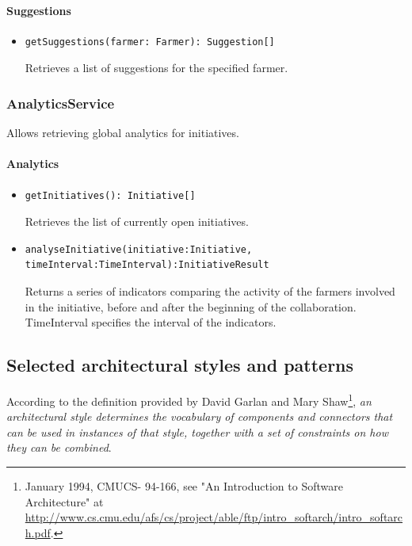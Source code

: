 \documentclass{article}
\begin{document}
\paragraph{Suggestions}
\begin{itemize}
\item \begin{verbatim}
getSuggestions(farmer: Farmer): Suggestion[]
\end{verbatim}
Retrieves a list of suggestions for the specified farmer.
\end{itemize}

\subsubsection{AnalyticsService}
Allows retrieving global analytics for initiatives.

\paragraph{Analytics}
\begin{itemize}
\item \begin{verbatim}
getInitiatives(): Initiative[]
\end{verbatim}
Retrieves the list of currently open initiatives.
\item \begin{verbatim}
analyseInitiative(initiative:Initiative, timeInterval:TimeInterval):InitiativeResult
\end{verbatim}
Returns a series of indicators comparing the activity of the farmers involved in the initiative, before and after the beginning of the collaboration. TimeInterval specifies the interval of the indicators.
\end{itemize}

\subsection{Selected architectural styles and patterns}
According to the definition provided by David Garlan and Mary Shaw\footnote{January 1994, CMUCS-
94-166, see "An Introduction to Software Architecture"
at \url{http://www.cs.cmu.edu/afs/cs/project/able/ftp/intro_softarch/intro_softarch.pdf}.}, \textit{an architectural style determines the vocabulary of components and connectors that can be used in instances of that style, together with a set of constraints on how they can be combined}.\\
\end{document}
